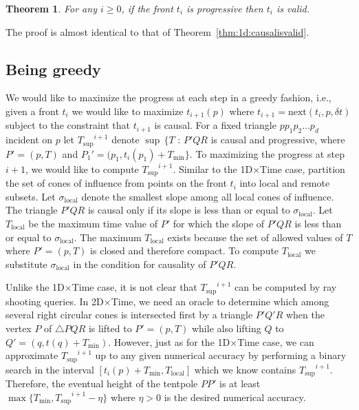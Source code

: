 \documentclass[twocolumn]{article}
\def\S{\ensuremath{\sigma}}
\def\minT{\ensuremath{T_{\text{min}}}}
\def\supT{\ensuremath{T_{\text{sup}}}}
\def\fp{\ensuremath{P}}
\def\fq{\ensuremath{Q}}
\def\fr{\ensuremath{R}}
\def\dt{\ensuremath{\delta t}}
\def\next{\text{next}}
\newtheorem{theorem}[lemma]{Theorem}
\begin{document}
\begin{theorem}
  For any $i \ge 0$, if the front $t_i$ is progressive then $t_i$ is
  valid.
\label{thm:2d:progressiveisvalid}
\end{theorem}

The proof is almost identical to that of Theorem~\ref{thm:1d:causalisvalid}.




\subsection{Being greedy}

We would like to maximize the progress at each step in a greedy
fashion, i.e., given a front $t_i$ we would like to maximize
$t_{i+1}(p)$ where $t_{i+1} = \next(t_i,p,\dt)$ subject to the
constraint that $t_{i+1}$ is causal.  For a fixed triangle
$pp_1p_2{\ldots}p_d$ incident on $p$ let $\supT^{i+1}$ denote
$\sup\,\{T$ : $\fp'\fq\fr$ is causal and progressive, where
$\fp'=(p,T)$ and $\fp_1'=(p_1,t_i(p_1)+\minT\}$.  To maximizing the
progress at step $i+1$, we would like to compute $\supT^{i+1}$.
Similar to the 1D$\times$Time case, partition the set of cones of
influence from points on the front $t_i$ into local and remote
subsets.  Let $\S_{\text{local}}$ denote the smallest slope among all
local cones of influence.  The triangle $\fp'\fq\fr$ is causal only if
its slope is less than or equal to $\S_{\text{local}}$.  Let
$T_{\text{local}}$ be the maximum time value of $\fp'$ for which the
slope of $\fp'\fq\fr$ is less than or equal to $\S_{\text{local}}$.
The maximum $T_{\text{local}}$ exists because the set of allowed
values of $T$ where $\fp'=(p,T)$ is closed and therefore compact.  To
compute $T_{\text{local}}$ we substitute $\S_{\text{local}}$ in the
condition for causality of $\fp'\fq\fr$.

Unlike the 1D$\times$Time case, it is not clear that $\supT^{i+1}$ can
be computed by ray shooting queries.  In 2D$\times$Time, we need an
oracle to determine which among several right circular cones is
intersected first by a triangle $\fp'\fq'\fr$ when the vertex $\fp$ of
$\triangle{\fp\fq\fr}$ is lifted to $\fp'=(p,T)$ while also lifting
$\fq$ to $\fq'=(q,t(q)+\minT)$.  However, just as for the
1D$\times$Time case, we can approximate $\supT^{i+1}$ up to any given
numerical accuracy by performing a binary search in the interval
$[t_i(p)+\minT, T_{\text{local}}]$ which we know contains
$\supT^{i+1}$.  Therefore, the eventual height of the tentpole
$\fp\fp'$ is at least $\max\{\minT, \supT^{i+1} - \eta\}$ where $\eta
> 0$ is the desired numerical accuracy.
\end{document}
